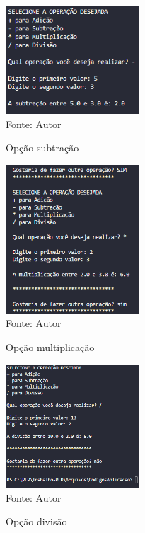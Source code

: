 	\begin{figure}[H]
		\begin{center}
			\caption{Opção subtração} \label{ling1}
			\includegraphics[width=5cm]{subtracao.PNG} \\
			{\tiny \sf Fonte:{ Autor}}
		\end{center}
	\end{figure}

	\begin{figure}[H]
		\begin{center}
			\caption{Opção multiplicação} \label{ling1}
			\includegraphics[width=5cm]{multi.PNG} \\
			{\tiny \sf Fonte:{ Autor}}
		\end{center}
	\end{figure}
	
	\begin{figure}[H]
		\begin{center}
			\caption{Opção divisão} \label{ling1}
			\includegraphics[width=5cm]{divisao.PNG} \\
			{\tiny \sf Fonte:{ Autor}}
		\end{center}
	\end{figure}
	
